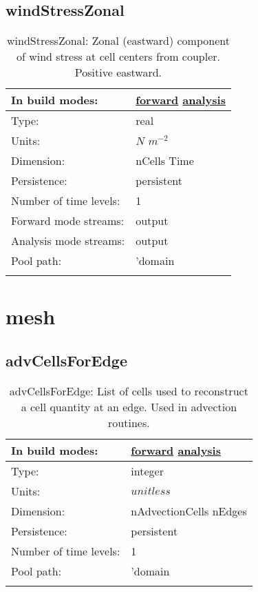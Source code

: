 \subsection[windStressZonal]{windStressZonal}
\label{subsec:var_sec_forcing_windStressZonal}
\begin{center}
\begin{longtable}{| p{2.0in} | p{4.0in} |}
        \hline 
        In build modes: & \hyperref[subsec:forward_var_tab_forcing]{forward} \hyperref[subsec:analysis_var_tab_forcing]{analysis} \\
        \hline 
        Type: & real \\
        \hline 
        Units: & $N$ $m^{-2}$ \\
        \hline 
        Dimension: & nCells Time \\
        \hline 
        Persistence: & persistent \\
        \hline 
        Number of time levels: & 1 \\
        \hline 
		 Forward mode streams: &  output \\
        \hline 
		 Analysis mode streams: &  output \\
        \hline 
            Pool path: & 'domain %
 \\
		 \hline 
    \caption{windStressZonal: Zonal (eastward) component of wind stress at cell centers from coupler. Positive eastward.}
\end{longtable}
\end{center}
\section[mesh]{mesh}
\label{sec:var_sec_mesh}
\subsection[advCellsForEdge]{advCellsForEdge}
\label{subsec:var_sec_mesh_advCellsForEdge}
\begin{center}
\begin{longtable}{| p{2.0in} | p{4.0in} |}
        \hline 
        In build modes: & \hyperref[subsec:forward_var_tab_mesh]{forward} \hyperref[subsec:analysis_var_tab_mesh]{analysis} \\
        \hline 
        Type: & integer \\
        \hline 
        Units: & $unitless$ \\
        \hline 
        Dimension: & nAdvectionCells nEdges \\
        \hline 
        Persistence: & persistent \\
        \hline 
        Number of time levels: & 1 \\
        \hline 
            Pool path: & 'domain %
 \\
		 \hline 
    \caption{advCellsForEdge: List of cells used to reconstruct a cell quantity at an edge. Used in advection routines.}
\end{longtable}
\end{center}
